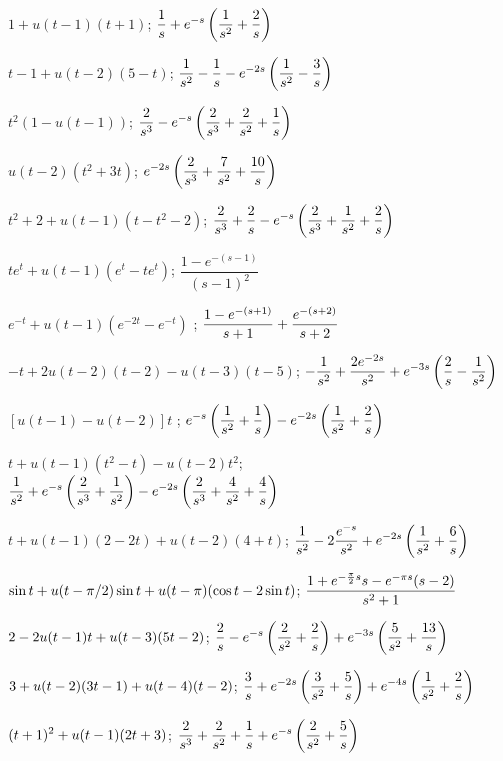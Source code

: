  $1+u(t-1)(t+1)$;\;   $\displaystyle{\frac{1}{s}
+e^{-s}\left(\frac{1}{s^2}+\frac{2}{s}\right)}$

 $t-1+u(t-2)(5-t)$;\;   $\displaystyle{\frac{1}{s^2}-\frac{1}{s}-e^{-2s}\left(\frac{1}{s^2}-\frac{3}{s}\right)}$

  $t^2\left(1-u(t-1)\right)$;\;
$\displaystyle{
\frac{2}{s^3}-e^{-s}\left(\frac{2}{s^3}+\frac{2}{s^2}+\frac{1}{s}\right)}$

 $u(t-2)(t^2+3t)$;\;   $\displaystyle{
e^{-2s}\left(\frac{2}{s^3}+\frac{7}{s^2}+\frac{10}{s}\right)}$

 $t^2+2+u(t-1)(t-t^2-2)$;\;   $\displaystyle{\frac{2}{s^3} +\frac{2}{s}-e^{-s}\left(\frac{2}{s^3}+\frac{1}{s^2}+\frac{2}{s}\right)}$

 $te^t+u(t-1)(e^t-te^t)$;\;
$\dfrac{1-e^{-(s-1)}}{(s-1)^2}$

 $e^{-t}+u(t-1)(e^{-2t}-e^{-t})$ ;\;
$\displaystyle{\frac{1-e^{-(s+1)}}{s+1}+\frac{e^{-(s+2)}}{s+2}}$

 $-t+2u(t-2)(t-2)-u(t-3)(t-5)$;\;
$\displaystyle{-\frac{1}{s^2}+ \frac{2e^{-2s}}{s^2}+e^{-3s}\left(\frac{2}{s}-\frac{1}{s^2}\right)}$

 $\left[u(t-1)-u(t-2)\right]t$ ;\;   $\displaystyle{
e^{-s}\left(\frac{1}{s^2}+\frac{1}{s}\right)-e^{-2s}\left(\frac{1}{s^2}
+\frac{2}{s}\right)}$

 $t+u(t-1)(t^2-t)-u(t-2)t^2$;\;
$\displaystyle{\frac{1}{s^2}+ e^{-s}\left(\frac{2}{s^3}+\frac{1}{s^2}\right)
-e^{-2s}\left(\frac{2}{s^3}+\frac{4}{s^2}+\frac{4}{s}\right)}$

 $t+u(t-1)(2-2t)+u(t-2)(4+t)$;\;
$\displaystyle{\frac{1}{s^2} -2\frac{e^{-s}}{s^2}+e^{-2s}\left(\frac{1}{s^2}+\frac{6}{s}\right)}$

 $\displaystyle{\sin t+ u(t-\pi/2)\sin t+u(t-\pi) (\cos
t-2\sin t)}$;\;   $\displaystyle{\frac{1+ e^{-\frac{\pi}{2}s}s-e^{-\pi s}(s-2)}{s^2+1}}$

 $\displaystyle{2-2u(t-1)t+u(t-3)(5t-2)}$;\;
$\displaystyle{\frac{2}{s}-e^{-s}\left(\frac{2}{s^2}+\frac{2}{s}\right)+e^{-3s}\left(\frac{5}{s^2}+\frac{13}{s}\right)}$

 $\displaystyle{3+u(t-2)(3t-1)+u(t-4)(t-2)}$;\;
$\displaystyle{\frac{3}{s}+e^{-2s}\left(\frac{3}{s^2}+\frac{5}{s}\right)+e^{-4s}\left(\frac{1}{s^2}+\frac{2}{s}\right)}$

 $\displaystyle{(t+1)^2+u(t-1)(2t+3)}$;\;
$\displaystyle{\frac{2}{s^3}+\frac{2}{s^2}+\frac{1}{s}+e^{-s}\left(\frac{2}{s^2}+\frac{5}{s}\right)}$

